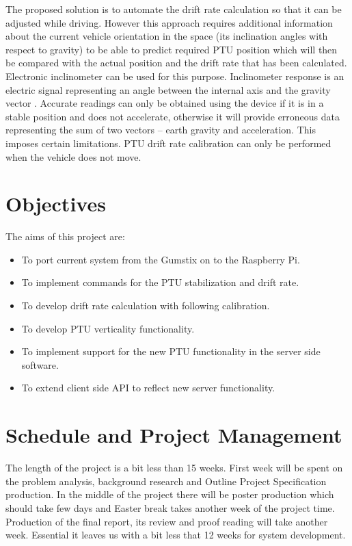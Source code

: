 The proposed solution is to automate the drift rate calculation so that it can be adjusted while driving. However this approach requires additional information about the current vehicle orientation in the space (its inclination angles with respect to gravity) to be able to predict required PTU position which will then be compared with the actual position and the drift rate that has been calculated. Electronic inclinometer can be used for this purpose. Inclinometer response is an electric signal representing an angle between the internal axis and the gravity vector \cite{HandbookOfModernSensors}. Accurate readings can only be obtained using the device if it is in a stable position and does not accelerate, otherwise it will provide erroneous data representing the sum of two vectors – earth gravity and acceleration. This imposes certain limitations. PTU drift rate calibration can only be performed when the vehicle does not move.

\section{Objectives}

The aims of this project are:
\begin{itemize}
\item To port current system from the Gumstix on to the Raspberry Pi.
\item To implement commands for the PTU stabilization and drift rate.
\item To develop drift rate calculation with following calibration.
\item To develop PTU verticality functionality.
\item To implement support for the new PTU functionality in the server side software.
\item To extend client side API to reflect new server functionality.
\end{itemize}

\section{Schedule and Project Management}
The length of the project is a bit less than 15 weeks. First week will be spent on the problem analysis, background research and Outline Project Specification production. In the middle of the project there will be poster production which should take few days and Easter break takes another week of the project time. Production of the final report, its review and proof reading will take another week. Essential it leaves us with a bit less that 12 weeks for system development.

